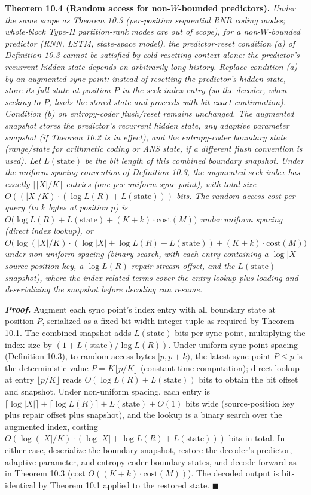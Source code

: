 \documentclass[
]{article}
\begin{document}
\textbf{Theorem 10.4 (Random access for non-$W$-bounded predictors).}
\emph{Under the same scope as Theorem 10.3 (per-position sequential
RNR coding modes; whole-block Type-II partition-rank modes are out
of scope), for a non-$W$-bounded predictor (RNN, LSTM, state-space
model), the predictor-reset condition (a) of Definition 10.3 cannot
be satisfied by cold-resetting context alone: the predictor's
recurrent hidden state depends on arbitrarily long history. Replace
condition (a) by an \emph{augmented sync point}: instead of
resetting the predictor's hidden state, store its full state at
position $P$ in the seek-index entry (so the decoder, when seeking
to $P$, loads the stored state and proceeds with bit-exact
continuation). Condition (b) on entropy-coder flush/reset remains
unchanged. The augmented snapshot stores the predictor's recurrent
hidden state, any adaptive parameter snapshot (if Theorem 10.2 is
in effect), and the entropy-coder boundary state (range/state for
arithmetic coding or ANS state, if a different flush convention is
used). Let $L(\text{state})$ be the bit length of this combined
boundary snapshot. Under the uniform-spacing convention of
Definition 10.3, the augmented seek index has exactly
$\lceil |X|/K \rceil$ entries (one per uniform sync point), with
total size $O((|X|/K) \cdot (\log L(R) + L(\text{state})))$ bits.
The random-access cost per query (to $k$ bytes at position $p$) is
$O\bigl(\log L(R) + L(\text{state}) + (K + k) \cdot
\mathrm{cost}(M)\bigr)$ under uniform spacing (direct index lookup),
or $O\bigl(\log(|X|/K) \cdot (\log |X| + \log L(R) + L(\text{state})) + (K + k)
\cdot \mathrm{cost}(M)\bigr)$ under non-uniform spacing (binary
search, with each entry containing a $\log |X|$ source-position
key, a $\log L(R)$ repair-stream offset, and the $L(\text{state})$
snapshot), where the index-related terms cover the entry lookup
plus loading and deserializing the snapshot before decoding can
resume.}

\emph{\textbf{Proof.}} Augment each sync point's index entry with
all boundary state at position $P$, serialized as a fixed-bit-width
integer tuple as required by Theorem 10.1. The combined snapshot adds
$L(\text{state})$ bits per sync point, multiplying the index size by
$(1 + L(\text{state}) / \log L(R))$. Under uniform sync-point
spacing (Definition 10.3), to random-access bytes $[p, p+k)$, the
latest sync point $P \leq p$ is the deterministic value
$P = K \lfloor p/K \rfloor$ (constant-time computation); direct
lookup at entry $\lfloor p/K \rfloor$ reads
$O(\log L(R) + L(\text{state}))$ bits to obtain the bit offset and
snapshot. Under non-uniform spacing, each entry is
$\lceil \log |X| \rceil + \lceil \log L(R) \rceil + L(\text{state})
+ O(1)$ bits wide (source-position key plus repair offset plus
snapshot), and the lookup is a binary search over the augmented
index, costing
$O(\log(|X|/K) \cdot (\log |X| + \log L(R) + L(\text{state})))$
bits in total.
In either case, deserialize the boundary snapshot, restore the
decoder's predictor, adaptive-parameter, and entropy-coder boundary
states, and decode forward as in Theorem 10.3 (cost
$O((K+k) \cdot \mathrm{cost}(M))$).
The decoded output is bit-identical by Theorem 10.1 applied to the
restored state. \hfill$\blacksquare$
\end{document}
